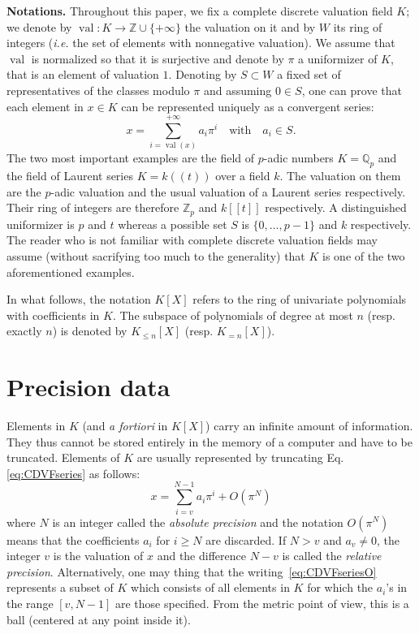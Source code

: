 \documentclass{sig-alternate-2013}
\DeclareMathOperator{\val}{val}
\newcommand{\Z}{\mathbb Z}
\newcommand{\Zp}{\Z_p}
\newcommand{\Q}{\mathbb Q}
\newcommand{\Qp}{\Q_p}
\begin{document}
\noindent
{\bf Notations.}
Throughout this paper, we fix a complete discrete valuation field $K$; 
we denote by $\val : K \to \Z \cup \{+\infty\}$ the valuation on it and 
by $W$ its ring of integers (\emph{i.e.} the set of elements with 
nonnegative valuation). We assume that $\val$ is normalized so that it
is surjective and denote by $\pi$ a uniformizer of $K$, that is an 
element of valuation $1$. Denoting by $S \subset W$ a fixed set of 
representatives of the classes modulo $\pi$ and assuming $0 \in S$, 
one can prove that each element in $x \in K$ can be represented 
uniquely as a convergent series:
\begin{equation}
\label{eq:CDVFseries}
x = \sum_{i=\val(x)}^{+\infty} a_i \pi^i
\quad \text{with} \quad a_i \in S.
\end{equation}
The two most important examples are the field of $p$-adic numbers $K = 
\Qp$ and the field of Laurent series $K = k((t))$ over a field $k$. The 
valuation on them are the $p$-adic valuation and the usual valuation of 
a Laurent series respectively. Their ring of integers are therefore 
$\Zp$ and $k[[t]]$ respectively. A distinguished uniformizer is $p$ 
and $t$ whereas a possible set $S$ is $\{0, \ldots, p-1\}$ and $k$
respectively.
The reader who is not familiar with complete discrete valuation fields
may assume (without sacrifying too much to the generality) that $K$ is
one of the two aforementioned examples.

In what follows, the notation $K[X]$ refers to the ring of univariate 
polynomials with coefficients in $K$. The subspace of polynomials of 
degree at most $n$ (resp. exactly $n$) is denoted by $K_{\leq n}[X]$ 
(resp. $K_{=n}[X]$).

\section{Precision data}

Elements in $K$ (and \emph{a fortiori} in $K[X]$) carry an infinite 
amount of information. They thus cannot be stored entirely in the
memory of a computer and have to be truncated. Elements of $K$ are
usually represented by truncating Eq.\eqref{eq:CDVFseries} as
follows:
\begin{equation}
\label{eq:CDVFseriesO}
x = \sum_{i=v}^{N-1} a_i \pi^i + O(\pi^N)
\end{equation}
where $N$ is an integer called the \emph{absolute precision} and 
the notation $O(\pi^N)$ means that the coefficients $a_i$ for $i
\geq N$ are discarded. If $N > v$ and $a_v \neq 0$, the integer $v$ 
is the valuation of $x$ and the difference $N-v$ is called the
\emph{relative precision}.
Alternatively, one may thing that the writing~\eqref{eq:CDVFseriesO}
represents a subset of $K$ which consists of all elements in $K$ for
which the $a_i$'s in the range $[v,N-1]$ are those specified. From the
metric point of view, this is a ball (centered at any point inside it).
\end{document}
